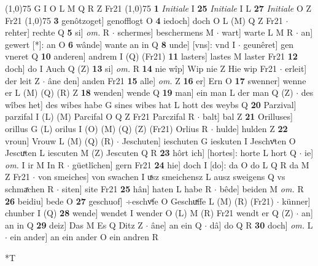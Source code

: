 \documentclass[8pt,a4paper,notitlepage]{article}
\begin{document}
\begin{table}[ht]
\begin{minipage}[t]{0.5\linewidth}
\begin{tabular}{rl}
\end{tabular}
\scriptsize
\line(1,0){75} \newline
G I O L M Q R Z Fr21 \newline
\line(1,0){75} \newline
\textbf{1} \textit{Initiale} I  \textbf{25} \textit{Initiale} I L  \textbf{27} \textit{Initiale} O Z Fr21  \newline
\line(1,0){75} \newline
\textbf{3} genôtzoget] genofflogt O \textbf{4} iedoch] doch O L (M) Q Z Fr21  $\cdot$ rehter] rechte Q \textbf{5} si] \textit{om.} R  $\cdot$ schermes] beschermens M  $\cdot$ wart] warte L M R  $\cdot$ an] gewert [*]: an O \textbf{6} wânde] wante an in Q \textbf{8} unde] [vns]: vnd I  $\cdot$ geunêret] gen vneret Q \textbf{10} anderen] andrem I (Q) (Fr21) \textbf{11} lasters] lastes M laster Fr21 \textbf{12} doch] do I Auch Q (Z) \textbf{13} si] \textit{om.} R \textbf{14} nie wîp] Wip nie Z Hie wip Fr21  $\cdot$ erleit] der leit Z  $\cdot$ âne den] anden Fr21 \textbf{15} alle] \textit{om.} Z \textbf{16} er] Ern O \textbf{17} swenner] wenne er L (M) (Q) (R) Z \textbf{18} wenden] wende Q \textbf{19} man] ein man L der man Q (Z)  $\cdot$ des wîbes het] des wibes habe G sines wibes hat L hott des weybs Q \textbf{20} Parzival] parzifal I (L) (M) Parcifal O Q Z Fr21 Parczifal R  $\cdot$ balt] bal Z \textbf{21} Orilluses] orillus G (L) orilus I (O) (M) (Q) (Z) (Fr21) Orlius R  $\cdot$ hulde] hulden Z \textbf{22} vroun] Vrouw L (M) (Q) (R)  $\cdot$ Jeschuten] ieschuten G ieskuten I Jeschvͦten O Jescuͯten L iescuten M (Z) Jescuten Q R \textbf{23} hôrt ich] [hortes]: horte L hort Q  $\cdot$ ie] \textit{om.} I ir M In R  $\cdot$ güetlîchen] gern Fr21 \textbf{24} hie] doch I [do]: da O do L Q R da M Z Fr21  $\cdot$ von smeiches] von swachen I uͯsz smeichensz L ausz sweigens Q vs schmaͯchen R  $\cdot$ siten] site Fr21 \textbf{25} hân] haten L habe R  $\cdot$ bêde] beiden M \textit{om.} R \textbf{26} beidiu] bede O \textbf{27} geschuof] ÷eschvͦfe O Geschuͯffe L (M) (R) (Fr21)  $\cdot$ künner] chunber I (Q) \textbf{28} wende] wendet I wender O (L) M (R) Fr21 wendt er Q (Z)  $\cdot$ an] an in Q \textbf{29} deiz] Das M Es Q Ditz Z  $\cdot$ âne] an ein Q  $\cdot$ dâ] do Q R \textbf{30} doch] \textit{om.} L  $\cdot$ ein ander] an ein ander O ein andren R \newline
\end{minipage}
\hspace{0.5cm}
\begin{minipage}[t]{0.5\linewidth}
\small
\begin{center}*T

\end{center}
\end{minipage}
\end{table}
\end{document}
